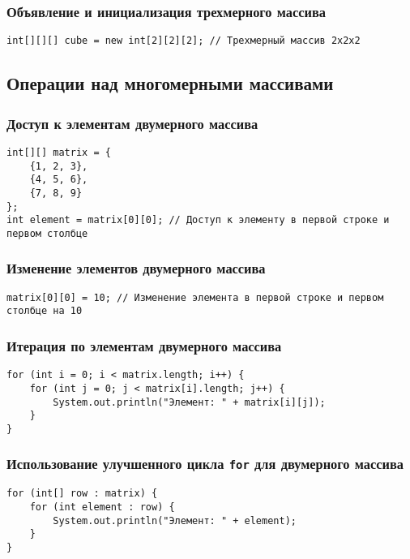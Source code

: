 \documentclass[12pt, a4paper]{article}
\begin{document}
\subsubsection*{Объявление и инициализация трехмерного массива}

\begin{verbatim}
int[][][] cube = new int[2][2][2]; // Трехмерный массив 2x2x2
\end{verbatim}

\subsection*{Операции над многомерными массивами}
\subsubsection*{Доступ к элементам двумерного массива}
\begin{verbatim}
int[][] matrix = {
    {1, 2, 3},
    {4, 5, 6},
    {7, 8, 9}
};
int element = matrix[0][0]; // Доступ к элементу в первой строке и первом столбце
\end{verbatim}

\subsubsection*{Изменение элементов двумерного массива}
\begin{verbatim}
matrix[0][0] = 10; // Изменение элемента в первой строке и первом столбце на 10
\end{verbatim}

\subsubsection*{Итерация по элементам двумерного массива}
\begin{verbatim}
for (int i = 0; i < matrix.length; i++) {
    for (int j = 0; j < matrix[i].length; j++) {
        System.out.println("Элемент: " + matrix[i][j]);
    }
}
\end{verbatim}

\subsubsection*{Использование улучшенного цикла \texttt{for} для двумерного массива}
\begin{verbatim}
for (int[] row : matrix) {
    for (int element : row) {
        System.out.println("Элемент: " + element);
    }
}
\end{verbatim}
\end{document}

